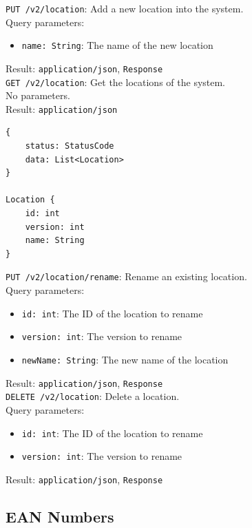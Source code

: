\documentclass[12pt]{report}
\begin{document}
\texttt{PUT /v2/location}: Add a new location into the system.\\
Query parameters:
\begin{itemize}
\item \texttt{name: String}: The name of the new location
\end{itemize}
Result: \texttt{application/json}, \texttt{Response}\vspace{7mm}\\
\texttt{GET /v2/location}: Get the locations of the system.\\
No parameters.\\
Result: \texttt{application/json}
\begin{lstlisting}
{
    status: StatusCode
    data: List<Location>
}

Location {
    id: int
    version: int
    name: String
}
\end{lstlisting}\vspace{7mm}
\texttt{PUT /v2/location/rename}: Rename an existing location.\\
Query parameters:
\begin{itemize}
\item \texttt{id: int}: The ID of the location to rename
\item \texttt{version: int}: The version to rename
\item \texttt{newName: String}: The new name of the location
\end{itemize}
Result: \texttt{application/json}, \texttt{Response}\vspace{7mm}\\
\texttt{DELETE /v2/location}: Delete a location.\\
Query parameters:
\begin{itemize}
\item \texttt{id: int}: The ID of the location to rename
\item \texttt{version: int}: The version to rename
\end{itemize}
Result: \texttt{application/json}, \texttt{Response}\vspace{7mm}\\

\subsection{EAN Numbers}
\end{document}
